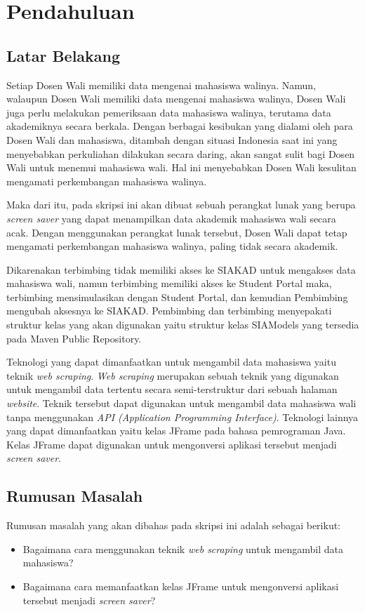 \chapter{Pendahuluan}
\label{chap:intro}
   
\section{Latar Belakang}
\label{sec:label}

Setiap Dosen Wali memiliki data mengenai mahasiswa walinya. Namun, walaupun Dosen Wali memiliki data mengenai mahasiswa walinya, Dosen Wali juga perlu melakukan pemeriksaan data mahasiswa walinya, terutama data akademiknya secara berkala. Dengan berbagai kesibukan yang dialami oleh para Dosen Wali dan mahasiswa, ditambah dengan situasi Indonesia saat ini yang menyebabkan perkuliahan dilakukan secara daring, akan sangat sulit bagi Dosen Wali untuk menemui mahasiswa wali. Hal ini menyebabkan Dosen Wali kesulitan mengamati perkembangan mahasiswa walinya. 

Maka dari itu, pada skripsi ini akan dibuat sebuah perangkat lunak yang berupa \textit{screen saver} yang dapat menampilkan data akademik mahasiswa wali secara acak. Dengan menggunakan perangkat lunak tersebut, Dosen Wali dapat tetap mengamati perkembangan mahasiswa walinya, paling tidak secara akademik.

Dikarenakan terbimbing tidak memiliki akses ke SIAKAD untuk mengakses data mahasiswa wali, namun terbimbing memiliki akses ke Student Portal maka, terbimbing mensimulasikan dengan Student Portal, dan kemudian Pembimbing mengubah aksesnya ke SIAKAD. Pembimbing dan terbimbing menyepakati struktur kelas yang akan digunakan yaitu struktur kelas SIAModels yang tersedia pada Maven Public Repository.

Teknologi yang dapat dimanfaatkan untuk mengambil data mahasiswa yaitu teknik \textit{web scraping}. \textit{Web scraping} merupakan sebuah teknik yang digunakan untuk mengambil data tertentu secara semi-terstruktur dari sebuah halaman \textit{website}. Teknik tersebut dapat digunakan untuk mengambil data mahasiswa wali tanpa menggunakan \textit{API (Application Programming Interface)}. Teknologi lainnya yang dapat dimanfaatkan yaitu kelas JFrame pada bahasa pemrograman Java. Kelas JFrame dapat digunakan untuk mengonversi aplikasi tersebut menjadi \textit{screen saver}.



\section{Rumusan Masalah}
\label{sec:rumusan}
Rumusan masalah yang akan dibahas pada skripsi ini adalah sebagai berikut:
\begin{itemize}
	\item Bagaimana cara menggunakan teknik \textit{web scraping} untuk mengambil data mahasiswa?
	\item Bagaimana cara memanfaatkan kelas JFrame untuk mengonversi aplikasi tersebut menjadi \textit{screen saver}?
\end{itemize}   

